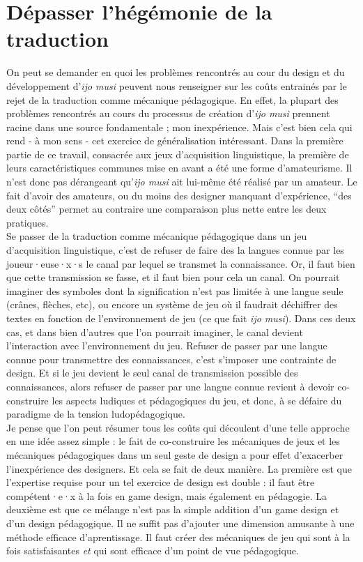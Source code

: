 \documentclass{scrartcl}
\begin{document}
	\section{Dépasser l'hégémonie de la traduction}
	On peut se demander en quoi les problèmes rencontrés au cour du design et du développement d'\textit{ijo musi} peuvent nous renseigner sur les coûts entrainés par le rejet de la traduction comme mécanique pédagogique. En effet, la plupart des problèmes rencontrés au cours du processus de création d'\textit{ijo musi} prennent racine dans une source fondamentale ; mon inexpérience. Mais c'est bien cela qui rend - à mon sens - cet exercice de généralisation intéressant. Dans la première partie de ce travail, consacrée aux jeux d'acquisition linguistique, la première de leurs caractéristiques communes mise en avant a été une forme d'amateurisme. Il n'est donc pas dérangeant qu'\textit{ijo musi} ait lui-même été réalisé par un amateur. Le fait d'avoir des amateurs, ou du moins des designer manquant d'expérience, “des deux côtés” permet au contraire une comparaison plus nette entre les deux pratiques.\\
	Se passer de la traduction comme mécanique pédagogique dans un jeu d'acquisition linguistique, c'est de refuser de faire des la langues connue par les joueur·euse·x·s le canal par lequel se transmet la connaissance. Or, il faut bien que cette transmission se fasse, et il faut bien pour cela un canal. On pourrait imaginer des symboles dont la signification n'est pas limitée à une langue seule (crânes, flèches, etc), ou encore un système de jeu où il faudrait déchiffrer des textes en fonction de l'environnement de jeu (ce que fait \textit{ijo musi}). Dans ces deux cas, et dans bien d'autres que l'on pourrait imaginer, le canal devient l'interaction avec l'environnement du jeu. Refuser de passer par une langue connue pour transmettre des connaissances, c'est s'imposer une contrainte de design. Et si le jeu devient le seul canal de transmission possible des connaissances, alors refuser de passer par une langue connue revient à devoir co-construire les aspects ludiques et pédagogiques du jeu, et donc, à se défaire du paradigme de la tension ludopédagogique. \\	
	Je pense que l'on peut résumer tous les coûts qui découlent d'une telle approche en une idée assez simple : le fait de co-construire les mécaniques de jeux et les mécaniques pédagogiques dans un seul geste de design a pour effet d'exacerber l'inexpérience des designers. Et cela se fait de deux manière. La première est que l'expertise requise pour un tel exercice de design est double : il faut être compétent·e·x à la fois en game design, mais également en pédagogie. La deuxième est que ce mélange n'est pas la simple addition d'un game design et d'un design pédagogique. Il ne suffit pas d'ajouter une dimension amusante à une méthode efficace d'aprentissage. Il faut créer des mécaniques de jeu qui sont à la fois satisfaisantes \textit{et} qui sont efficace d'un point de vue pédagogique.\\
\end{document}

